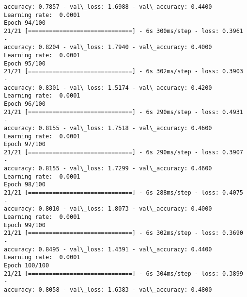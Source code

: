\documentclass[11pt]{article}
\begin{document}
\begin{Verbatim}[commandchars=\\\{\}]
accuracy: 0.7857 - val\_loss: 1.6988 - val\_accuracy: 0.4400
Learning rate:  0.0001
Epoch 94/100
21/21 [==============================] - 6s 300ms/step - loss: 0.3961 -
accuracy: 0.8204 - val\_loss: 1.7940 - val\_accuracy: 0.4000
Learning rate:  0.0001
Epoch 95/100
21/21 [==============================] - 6s 302ms/step - loss: 0.3903 -
accuracy: 0.8301 - val\_loss: 1.5174 - val\_accuracy: 0.4200
Learning rate:  0.0001
Epoch 96/100
21/21 [==============================] - 6s 290ms/step - loss: 0.4931 -
accuracy: 0.8155 - val\_loss: 1.7518 - val\_accuracy: 0.4600
Learning rate:  0.0001
Epoch 97/100
21/21 [==============================] - 6s 290ms/step - loss: 0.3907 -
accuracy: 0.8155 - val\_loss: 1.7299 - val\_accuracy: 0.4600
Learning rate:  0.0001
Epoch 98/100
21/21 [==============================] - 6s 288ms/step - loss: 0.4075 -
accuracy: 0.8010 - val\_loss: 1.8073 - val\_accuracy: 0.4000
Learning rate:  0.0001
Epoch 99/100
21/21 [==============================] - 6s 302ms/step - loss: 0.3690 -
accuracy: 0.8495 - val\_loss: 1.4391 - val\_accuracy: 0.4400
Learning rate:  0.0001
Epoch 100/100
21/21 [==============================] - 6s 304ms/step - loss: 0.3899 -
accuracy: 0.8058 - val\_loss: 1.6383 - val\_accuracy: 0.4800
    \end{Verbatim}
\end{document}
